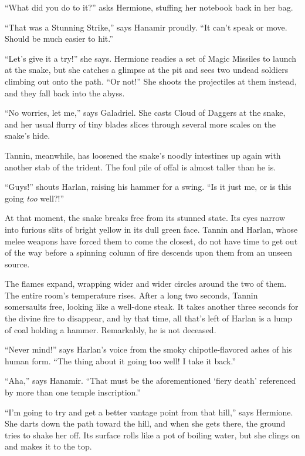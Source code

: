 \documentclass[smalldemyvopaper,11pt,twoside,onecolumn,openright,extrafontsizes]{memoir}
\begin{document}
``What did you do to it?'' asks Hermione, stuffing her notebook back in
her bag.

``That was a Stunning Strike,'' says Hanamir proudly. ``It can't speak
or move. Should be much easier to hit.''

``Let's give it a try!'' she says. Hermione readies a set of Magic
Missiles to launch at the snake, but she catches a glimpse at the pit
and sees two undead soldiers climbing out onto the path. ``Or not!'' She
shoots the projectiles at them instead, and they fall back into the
abyss.

``No worries, let me,'' says Galadriel. She casts Cloud of Daggers at
the snake, and her usual flurry of tiny blades slices through several
more scales on the snake's hide.

Tannin, meanwhile, has loosened the snake's noodly intestines up again
with another stab of the trident. The foul pile of offal is almost
taller than he is.

``Guys!'' shouts Harlan, raising his hammer for a swing. ``Is it just
me, or is this going \emph{too} well?!''

At that moment, the snake breaks free from its stunned state. Its eyes
narrow into furious slits of bright yellow in its dull green face.
Tannin and Harlan, whose melee weapons have forced them to come the
closest, do not have time to get out of the way before a spinning column
of fire descends upon them from an unseen source.

The flames expand, wrapping wider and wider circles around the two of
them. The entire room's temperature rises. After a long two seconds,
Tannin somersaults free, looking like a well-done steak. It takes
another three seconds for the divine fire to disappear, and by that
time, all that's left of Harlan is a lump of coal holding a hammer.
Remarkably, he is not deceased.

``Never mind!'' says Harlan's voice from the smoky chipotle-flavored
ashes of his human form. ``The thing about it going too well! I take it
back.''

``Aha,'' says Hanamir. ``That must be the aforementioned `fiery death'
referenced by more than one temple inscription.''

``I'm going to try and get a better vantage point from that hill,'' says
Hermione. She darts down the path toward the hill, and when she gets
there, the ground tries to shake her off. Its surface rolls like a pot
of boiling water, but she clings on and makes it to the top.
\end{document}
